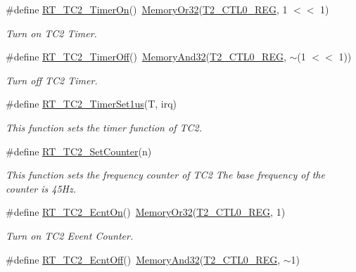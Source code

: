 \begin{DoxyCompactItemize}
\#define \mbox{\hyperlink{a00083_ab274ee44af2080d68745b2ec3af06648}{R\+T\+\_\+\+T\+C2\+\_\+\+Timer\+On}}()~\mbox{\hyperlink{a00026_a27874a97deab7cecdde5ddecf466e31e}{Memory\+Or32}}(\mbox{\hyperlink{a00026_a5853553391e986211306d4f29ab31e47}{T2\+\_\+\+C\+T\+L0\+\_\+\+R\+EG}}, 1 $<$$<$ 1)
\begin{DoxyCompactList}\small\item\em Turn on T\+C2 Timer. \end{DoxyCompactList}\item 
\#define \mbox{\hyperlink{a00083_a4328299fe0323ef75508eadf9b937ba1}{R\+T\+\_\+\+T\+C2\+\_\+\+Timer\+Off}}()~\mbox{\hyperlink{a00026_ad87cedffcaadc51db22594fce55173d4}{Memory\+And32}}(\mbox{\hyperlink{a00026_a5853553391e986211306d4f29ab31e47}{T2\+\_\+\+C\+T\+L0\+\_\+\+R\+EG}}, $\sim$(1 $<$$<$ 1))
\begin{DoxyCompactList}\small\item\em Turn off T\+C2 Timer. \end{DoxyCompactList}\item 
\#define \mbox{\hyperlink{a00083_a005265e28d070ee73720939fca9a815a}{R\+T\+\_\+\+T\+C2\+\_\+\+Timer\+Set1us}}(T,  irq)
\begin{DoxyCompactList}\small\item\em This function sets the timer function of T\+C2. \end{DoxyCompactList}\item 
\#define \mbox{\hyperlink{a00083_a28ff54e7b5cd20e082ea21b6731d5b51}{R\+T\+\_\+\+T\+C2\+\_\+\+Set\+Counter}}(n)
\begin{DoxyCompactList}\small\item\em This function sets the frequency counter of T\+C2 The base frequency of the counter is 45\+Hz. \end{DoxyCompactList}\item 
\#define \mbox{\hyperlink{a00083_a261544e2cbdbdeee0d22734b29827cd2}{R\+T\+\_\+\+T\+C2\+\_\+\+Ecnt\+On}}()~\mbox{\hyperlink{a00026_a27874a97deab7cecdde5ddecf466e31e}{Memory\+Or32}}(\mbox{\hyperlink{a00026_a5853553391e986211306d4f29ab31e47}{T2\+\_\+\+C\+T\+L0\+\_\+\+R\+EG}}, 1)
\begin{DoxyCompactList}\small\item\em Turn on T\+C2 Event Counter. \end{DoxyCompactList}\item 
\#define \mbox{\hyperlink{a00083_af77e205baae8e267fda5374c167ab76c}{R\+T\+\_\+\+T\+C2\+\_\+\+Ecnt\+Off}}()~\mbox{\hyperlink{a00026_ad87cedffcaadc51db22594fce55173d4}{Memory\+And32}}(\mbox{\hyperlink{a00026_a5853553391e986211306d4f29ab31e47}{T2\+\_\+\+C\+T\+L0\+\_\+\+R\+EG}}, $\sim$1)

\end{DoxyCompactItemize}
